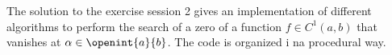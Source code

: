 The solution to the exercise session 2 gives an implementation of different
algorithms to perform the search of a zero of a function $ f \in C^{1} \left(a,
b \right) $ that vanishes at $ \alpha \in \openint{a}{b} $. The code is
organized i na procedural way.
